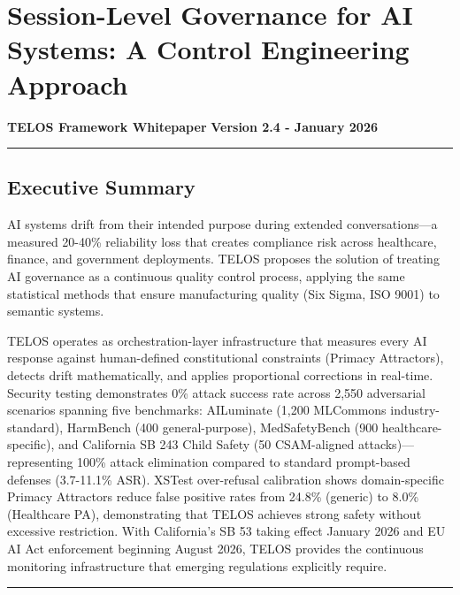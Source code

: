 \section{Session-Level Governance for AI Systems: A Control Engineering
Approach}\label{session-level-governance-for-ai-systems-a-control-engineering-approach}

\textbf{TELOS Framework Whitepaper} \textbf{Version 2.4 - January 2026}

\begin{center}\rule{0.5\linewidth}{0.5pt}\end{center}

\subsection{Executive Summary}\label{executive-summary}

AI systems drift from their intended purpose during extended
conversations---a measured 20-40\% reliability loss that creates
compliance risk across healthcare, finance, and government deployments.
TELOS proposes the solution of treating AI governance as a continuous
quality control process, applying the same statistical methods that
ensure manufacturing quality (Six Sigma, ISO 9001) to semantic systems.

TELOS operates as orchestration-layer infrastructure that measures every
AI response against human-defined constitutional constraints (Primacy
Attractors), detects drift mathematically, and applies proportional
corrections in real-time. Security testing demonstrates 0\% attack
success rate across 2,550 adversarial scenarios spanning five
benchmarks: AILuminate (1,200 MLCommons industry-standard), HarmBench
(400 general-purpose), MedSafetyBench (900 healthcare-specific), and
California SB 243 Child Safety (50 CSAM-aligned attacks)---representing
100\% attack elimination compared to standard prompt-based defenses
(3.7-11.1\% ASR). XSTest over-refusal calibration shows domain-specific
Primacy Attractors reduce false positive rates from 24.8\% (generic) to
8.0\% (Healthcare PA), demonstrating that TELOS achieves strong safety
without excessive restriction. With California's SB 53 taking effect
January 2026 and EU AI Act enforcement beginning August 2026, TELOS
provides the continuous monitoring infrastructure that emerging
regulations explicitly require.

\begin{center}\rule{0.5\linewidth}{0.5pt}\end{center}

